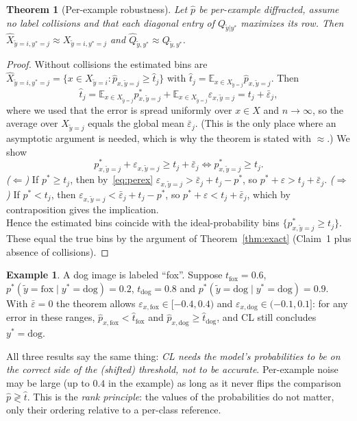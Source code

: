\documentclass[11pt,a4paper]{report}
\newcommand{\E}{\mathbb{E}}
\newcommand{\1}{\mathbf 1}
\newcommand{\eps}{\varepsilon}
\theoremstyle{definition}
\newtheorem{example}[definition]{Example}
\theoremstyle{plain}
\newtheorem{theorem}[definition]{Theorem}
\theoremstyle{remark}
\begin{document}
\begin{theorem}[Per-example robustness]\label{thm:perex}
Let $\hat p$ be per-example diffracted, assume no label collisions and that each diagonal entry of $Q_{\tilde y|y^*}$ maximizes its row. Then $\hat X_{\tilde y=i,y^*=j}\approx X_{\tilde y=i,y^*=j}$ and $\hat Q_{\tilde y,y^*}\approx Q_{\tilde y,y^*}$.
\end{theorem}
\begin{proof}
Without collisions the estimated bins are $\hat X_{\tilde y=i,y^*=j}=\{x\in X_{\tilde y=i}:\hat p_{x,\tilde y=j}\ge\hat t_j\}$ with $\hat t_j=\E_{x\in X_{\tilde y=j}}\hat p_{x,\tilde y=j}$. Then
\[
\hat t_j=\E_{x\in X_{\tilde y=j}}p^*_{x,\tilde y=j}+\E_{x\in X_{\tilde y=j}}\eps_{x,\tilde y=j}=t_j+\bar\eps_j,
\]
where we used that the error is spread uniformly over $x\in X$ and $n\to\infty$, so the average over $X_{\tilde y=j}$ equals the global mean $\bar\eps_j$. (This is the only place where an asymptotic argument is needed, which is why the theorem is stated with $\approx$.) We show
\[
p^*_{x,\tilde y=j}+\eps_{x,\tilde y=j}\ge t_j+\bar\eps_j\iff p^*_{x,\tilde y=j}\ge t_j .
\]
\emph{($\Leftarrow$)} If $p^*\ge t_j$, then by~\eqref{eq:perex} $\eps_{x,\tilde y=j}>\bar\eps_j+t_j-p^*$, so $p^*+\eps>t_j+\bar\eps_j$.
\emph{($\Rightarrow$)} If $p^*<t_j$, then $\eps_{x,\tilde y=j}<\bar\eps_j+t_j-p^*$, so $p^*+\eps<t_j+\bar\eps_j$, which by contraposition gives the implication.\\
Hence the estimated bins coincide with the ideal-probability bins $\{p^*_{x,\tilde y=j}\ge t_j\}$. These equal the true bins by the argument of Theorem~\ref{thm:exact} (Claim~1 plus absence of collisions).
\end{proof}

\begin{example}
A dog image is labeled ``fox''. Suppose $t_{\text{fox}}=0.6$, $p^*(\tilde y=\text{fox}\mid y^*=\text{dog})=0.2$, $t_{\text{dog}}=0.8$ and $p^*(\tilde y=\text{dog}\mid y^*=\text{dog})=0.9$. With $\bar\eps=0$ the theorem allows $\eps_{x,\text{fox}}\in[-0.4,0.4)$ and $\eps_{x,\text{dog}}\in(-0.1,0.1]$: for any error in these ranges, $\hat p_{x,\text{fox}}<\hat t_{\text{fox}}$ and $\hat p_{x,\text{dog}}\ge\hat t_{\text{dog}}$, and CL still concludes $y^*=\text{dog}$.
\end{example}

\begin{keyidea}
All three results say the same thing: \emph{CL needs the model's probabilities to be on the correct side of the (shifted) threshold, not to be accurate}. Per-example noise may be large (up to $0.4$ in the example) as long as it never flips the comparison $\hat p\gtrless\hat t$. This is the \emph{rank principle}: the values of the probabilities do not matter, only their ordering relative to a per-class reference.
\end{keyidea}
\end{document}
